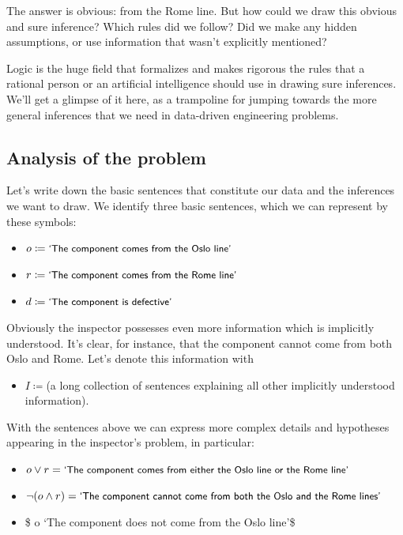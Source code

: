 \documentclass[
  a4paper,
  DIV=11,
  numbers=noendperiod,
  oneside]{scrreprt}
\providecommand{\tightlist}{%
  \setlength{\itemsep}{0pt}\setlength{\parskip}{0pt}}\usepackage{longtable,booktabs,array}
\begin{document}
The answer is obvious: from the Rome line. But how could we draw this
obvious and sure inference? Which rules did we follow? Did we make any
hidden assumptions, or use information that wasn't explicitly mentioned?

Logic is the huge field that formalizes and makes rigorous the rules
that a rational person or an artificial intelligence should use in
drawing sure inferences. We'll get a glimpse of it here, as a trampoline
for jumping towards the more general inferences that we need in
data-driven engineering problems.

\hypertarget{analysis-of-the-problem}{%
\subsection{Analysis of the problem}\label{analysis-of-the-problem}}

Let's write down the basic sentences that constitute our data and the
inferences we want to draw. We identify three basic sentences, which we
can represent by these symbols:

\begin{itemize}
\item
  \(o \coloneqq \textsf{\small`The component comes from the Oslo line'}\)
\item
  \(r \coloneqq \textsf{\small`The component comes from the Rome line'}\)
\item
  \(d \coloneqq \textsf{\small`The component is defective'}\)
\end{itemize}

Obviously the inspector possesses even more information which is
implicitly understood. It's clear, for instance, that the component
cannot come from both Oslo and Rome. Let's denote this information with

\begin{itemize}
\tightlist
\item
  \(I \coloneqq{}\)(a long collection of sentences explaining all other
  implicitly understood information).\\
\end{itemize}

With the sentences above we can express more complex details and
hypotheses appearing in the inspector's problem, in particular:

\begin{itemize}
\item
  \(o \lor r = \textsf{\small`The component comes from either the Oslo line or the Rome line'}\)
\item
  \(\lnot(o \land r) = \textsf{\small`The component cannot come from both the Oslo and the Rome lines'}\)
\item
  \$ \lnot o
  \coloneqq \textsf{\small`The component does not come from the Oslo line'}\$
\end{itemize}
\end{document}
